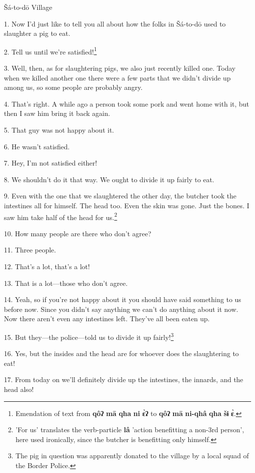 \setcounter{footnote}{0}

Šá-to-dō Village

1. Now I'd just like to tell you all about how the folks in Šá-to-dō used to
slaughter a pig to eat.

2. Tell us until we're satisfied!\footnote{Emendation of text from \textbf{qôʔ} \textbf{mā} \textbf{qha} \textbf{ni} \textbf{ɛ̀ʔ} to \textbf{qôʔ} \textbf{mā} \textbf{ni-qhâ} \textbf{qha} \textbf{šɨ} \textbf{ɛ̀}.}

3. Well, then, as for slaughtering pigs, we also just recently killed one. Today
when we killed another one there were a few parts that we didn't divide up among
us, so some people are probably angry.

4. That's right. A while ago a person took some pork and went home with it, but
then I saw him bring it back again.

5. That guy was not happy about it.

6. He wasn't satisfied.

7. Hey, I'm not satisfied either!

8. We shouldn't do it that way. We ought to divide it up fairly to eat.

9. Even with the one that we slaughtered the other day, the butcher took the intestines
all for himself. The head too. Even the skin was gone. Just the bones. I saw him
take half of the head for us.\footnote{'For us' translates the verb-particle \textbf{lâ} 'action benefitting a non-3rd person', here used ironically, since the butcher is benefitting only himself.}

10. How many people are there who don't agree?

11. Three people.

12. That's a lot, that's a lot!

13. That is a lot---those who don't agree.

14. Yeah, so if you're not happy about it you should have said something to us
before now. Since you didn't say anything we can't do anything about it now. Now
there aren't even any intestines left. They've all been eaten up.

15. But they---the police---told us to divide it up fairly!\footnote{The pig in question was apparently donated to the village by a local squad of the Border Police.}

16. Yes, but the insides and the head are for whoever does the slaughtering to
eat!

17. From today on we'll definitely divide up the intestines, the innards, and the
head also!

